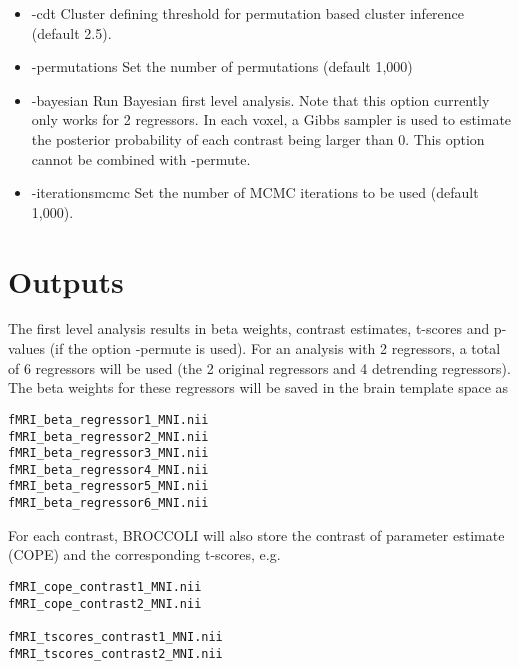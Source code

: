 \begin{itemize}
\item -cdt 
\newline \newline Cluster defining threshold for permutation based cluster inference (default 2.5). 

\item -permutations 
\newline \newline Set the number of permutations (default 1,000)

\item -bayesian 
\newline \newline Run Bayesian first level analysis.  Note that this option currently only works for 2 regressors. In each voxel, a Gibbs sampler is used to estimate the posterior probability of each contrast being larger than 0. This option cannot be combined with -permute.

\item -iterationsmcmc 
\newline \newline Set the number of MCMC iterations to be used (default 1,000).

\end{itemize}

\section{Outputs}

The first level analysis results in beta weights, contrast estimates, t-scores and p-values (if the option -permute is used). For an analysis with 2 regressors, a total of 6 regressors will be used (the 2 original regressors and 4 detrending regressors). The beta weights for these regressors will be saved in the brain template space as

\begin{verbatim}
fMRI_beta_regressor1_MNI.nii 
fMRI_beta_regressor2_MNI.nii 
fMRI_beta_regressor3_MNI.nii 
fMRI_beta_regressor4_MNI.nii 
fMRI_beta_regressor5_MNI.nii 
fMRI_beta_regressor6_MNI.nii 
\end{verbatim}

For each contrast, BROCCOLI will also store the contrast of parameter estimate (COPE) and the corresponding t-scores, e.g.

\begin{verbatim}
fMRI_cope_contrast1_MNI.nii  
fMRI_cope_contrast2_MNI.nii  

fMRI_tscores_contrast1_MNI.nii
fMRI_tscores_contrast2_MNI.nii
\end{verbatim}

